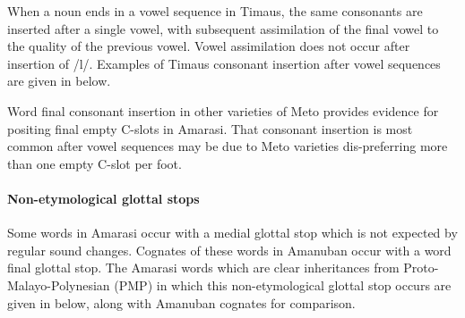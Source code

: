 When a noun ends in a vowel sequence in Timaus,
the same consonants are inserted after a single vowel,
with subsequent assimilation of the final vowel to the quality of the previous vowel.
Vowel assimilation does not occur after insertion of /l/.
Examples of Timaus consonant insertion after vowel sequences
are given in  below.

\begin{exe}
	\label{ex:TimConIns2}
\end{exe}

Word final consonant insertion in other varieties of
Meto provides evidence for positing final empty C-slots
in Amarasi. That consonant insertion is most common
after vowel sequences may be due to Meto varieties
dis-preferring more than one empty C-slot per foot.

\paragraph{Non-etymological glottal stops}\label{sec:NonEtyGloSto}
Some words in Amarasi occur with a medial glottal stop
which is not expected by regular sound changes.
Cognates of these words in Amanuban occur with a word final glottal stop.
The Amarasi words which are clear inheritances from
Proto-Malayo-Polynesian (PMP) in which this non-etymological
glottal stop occurs are given in  below,
along with Amanuban cognates for comparison.

\begin{exe}
	\label{ex:NonEtyGloSto}
\end{exe}

